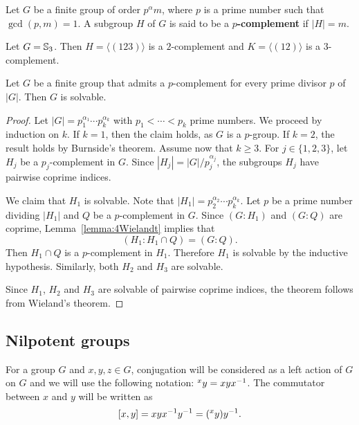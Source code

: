 \begin{definition}
Let $G$ be a finite group of order $p^{\alpha}m$, where $p$ is a prime number such that 
$\gcd(p,m)=1$. A subgroup 
$H$ of $G$ is said to be a \textbf{$p$-complement} if $|H|=m$. 
\end{definition}

\begin{example}
Let $G=\mathbb{S}_3$. Then $H=\langle (123)\rangle$ is a $2$-complement and 
$K=\langle (12)\rangle$ is a $3$-complement.
\end{example}

\begin{theorem}[Hall]
\label{theorem:Hall:solvable}
Let $G$ be a finite group that admits a $p$-complement for every prime divisor $p$ of $|G|$. 
Then $G$ is solvable. 
\end{theorem}

\begin{proof}
	Let $|G|=p_1^{\alpha_1}\cdots
	p_k^{\alpha_k}$ with $p_1<\cdots<p_k$ prime numbers. We proceed by induction on $k$. 
	If $k=1$, then the claim holds, as $G$ is a $p$-group. If $k=2$, the result holds by
        Burnside's theorem. Assume now that 
	$k\geq3$. For $j\in\{1,2,3\}$, let $H_j$ be a $p_j$-complement in 
	$G$. Since $|H_j|=|G|/p_j^{\alpha_j}$, the subgroups $H_j$ have pairwise coprime indices.

	We claim that $H_1$ is solvable. Note that $|H_1|=p_2^{\alpha_2}\cdots
	p_k^{\alpha_k}$. Let $p$ be a prime number dividing $|H_1|$ and $Q$ be a 
	$p$-complement in $G$. 
	Since $(G:H_1)$ and $(G:Q)$ are
	coprime, Lemma~\ref{lemma:4Wielandt} implies that  
	\[
	(H_1:H_1\cap Q)=(G:Q). 
	\]
	Then $H_1\cap Q$ is a $p$-complement in $H_1$.  Therefore $H_1$ is
	solvable by the inductive hypothesis. Similarly, both $H_2$ and 
	$H_3$ are solvable.

	Since $H_1$, $H_2$ and $H_3$ are solvable of pairwise coprime indices, 
        the theorem follows from Wieland's theorem. 
\end{proof}

\subsection{Nilpotent groups}

For a group $G$ and $x,y,z\in G$, conjugation will be considered as a left action of $G$ on $G$ 
and we will use the following notation: $\prescript{x}{}y=xyx^{-1}$. The commutator between $x$ and $y$ 
will be written as 
\[
[x,y]=xyx^{-1}y^{-1}=(\prescript{x}{}y)y^{-1}.
\]

